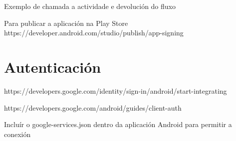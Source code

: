 Exemplo de chamada a actividade e devolución do fluxo

Para publicar a aplicación na Play Store
https://developer.android.com/studio/publish/app-signing




\section{Autenticación}

https://developers.google.com/identity/sign-in/android/start-integrating


https://developers.google.com/android/guides/client-auth


Incluír o google-services.json dentro da aplicación Android para permitir a conexión